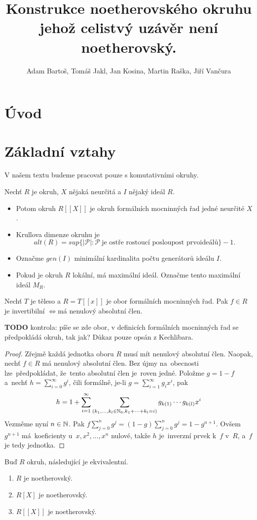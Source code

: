 \documentclass[11pt,a4paper]{article}
\title{Konstrukce noetherovského okruhu jehož celistvý uzávěr není
	noetherovský.}
\author{Adam Bartoš, Tomáš Jakl, Jan Kosina, Martin Raška, Jiří Vančura}
\newcommand\p[1]{\mathcal{ #1 }} %
\newcommand\IFF{\ensuremath{\iff}}
\theoremstyle{definition}
\theoremstyle{plain}
\begin{document}
\maketitle
\section{Úvod}

\section{Základní vztahy}
V našem textu budeme pracovat pouze s komutativními okruhy.

 Nechť $R$ je okruh, $X$ nějaká neurčitá a $I$ nějaký ideál $R$.
\begin{itemize}
	\item Potom okruh $R[[X]]$ je okruh formálních mocninných řad jedné
	neurčité $X$.
	\item Krullova dimenze okruhu je $$alt(R) = sup \{ |\p P| : \p P~\text{je
	ostře rostoucí posloupost prvoideálů} \} - 1.$$
	\item Označme $gen(I)$ minimální kardinalita počtu generátorů ideálu $I$.
	\item Pokud je okruh $R$ lokální, má maximální ideál. Označme tento
	maximální ideál $M_R$.
\end{itemize}

\veta Nechť $T$ je těleso a $R = T[[x]]$ je obor formálních mocninných řad. Pak
$f \in R$ je invertibilní \IFF má nenulový absolutní člen.

\textbf{TODO} kontrola: píše se zde obor, v definicích formálních mocninných
řad se předpokládá okruh, tak jak? Důkaz pouze opsán z Kechlibara.

\begin{proof}
	Zřejmě každá jednotka oboru $R$ musí mít nenulový absolutní člen. Naopak,
	nechť $f\in R$ má nenulový absolutní člen. Bez újmy na~obecnosti
	lze~před\-po\-klá\-dat, že~tento absolutní člen je~roven jedné. Položme $g=
	1-f$ a~nechť $h =  \sum_{i= 0}^\infty g^i$, čili formálně, je-li $g=
	\sum_{i= 1}^\infty g_ix^i$, pak $$h= 1+\sum_{i= 1}^\infty
	\sum_{(k_1,\dots,k_l\in \Bbb N_0, k_1+\dots+k_l= i)} g_{k(1)}\cdots
	g_{k(l)}x^i$$ Vezměme nyní $n\in \Bbb N$. Pak $f\sum_{j= 0}^n g^j =
	(1-g)\sum_{j= 0}^n g^j =  1 - g^{n+1}$. Ovšem $g^{n+1}$ má~koeficienty
	u~$x,x^2,\dots,x^n$ nulové, takže $h$ je~inverzní prvek k~$f$ v~$R$, a~$f$
	je tedy jednotka.
\end{proof}

 Buď $R$ okruh, následující je ekvivalentní.
\begin{enumerate}
	\item $R$ je noetherovský.
	\item $R[X]$ je noetherovský.
	\item $R[[X]]$ je noetherovský.
\end{enumerate}
\end{document}
